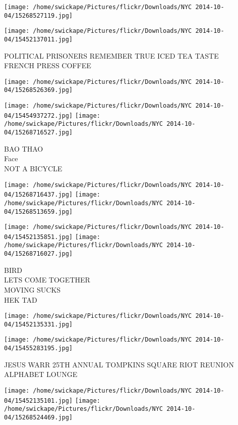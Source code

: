 \documentclass[10pt,letterpaper]{article}
\begin{document}
\texttt{[image: /home/swickape/Pictures/flickr/Downloads/NYC 2014-10-04/15268527119.jpg]}

\vspace{0.25in}
\texttt{[image: /home/swickape/Pictures/flickr/Downloads/NYC 2014-10-04/15452137011.jpg]}

POLITICAL PRISONERS REMEMBER TRUE ICED TEA TASTE\\
FRENCH PRESS COFFEE
\pagebreak

\texttt{[image: /home/swickape/Pictures/flickr/Downloads/NYC 2014-10-04/15268526369.jpg]}

\vspace{0.25in}
\texttt{[image: /home/swickape/Pictures/flickr/Downloads/NYC 2014-10-04/15454937272.jpg]}
\texttt{[image: /home/swickape/Pictures/flickr/Downloads/NYC 2014-10-04/15268716527.jpg]}

BAO THAO\\
Face\\
NOT A BICYCLE
\pagebreak

\texttt{[image: /home/swickape/Pictures/flickr/Downloads/NYC 2014-10-04/15268716437.jpg]}
\texttt{[image: /home/swickape/Pictures/flickr/Downloads/NYC 2014-10-04/15268513659.jpg]}

\texttt{[image: /home/swickape/Pictures/flickr/Downloads/NYC 2014-10-04/15452135851.jpg]}
\texttt{[image: /home/swickape/Pictures/flickr/Downloads/NYC 2014-10-04/15268716027.jpg]}

BIRD\\
LETS COME TOGETHER\\
MOVING SUCKS\\
HEK TAD
\pagebreak

\texttt{[image: /home/swickape/Pictures/flickr/Downloads/NYC 2014-10-04/15452135331.jpg]}

\vspace{0.25in}
\texttt{[image: /home/swickape/Pictures/flickr/Downloads/NYC 2014-10-04/15455283195.jpg]}

JESUS WARR 25TH ANNUAL TOMPKINS SQUARE RIOT REUNION\\
ALPHABET LOUNGE
\pagebreak

\texttt{[image: /home/swickape/Pictures/flickr/Downloads/NYC 2014-10-04/15452135101.jpg]}
\texttt{[image: /home/swickape/Pictures/flickr/Downloads/NYC 2014-10-04/15268524469.jpg]}
\end{document}
